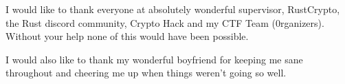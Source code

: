 I would like to thank everyone at absolutely wonderful supervisor,
RustCrypto, the Rust discord community, Crypto Hack and my CTF Team (0rganizers).
Without your help none of this would have been possible.

I would also like to thank my wonderful boyfriend for keeping me sane throughout and cheering me up when things weren't going so well.
